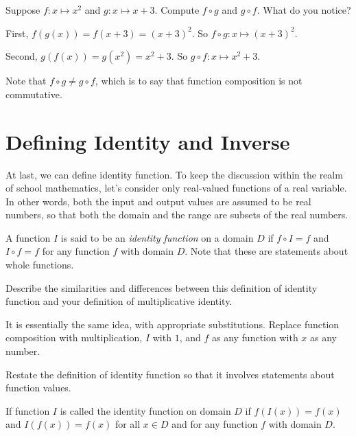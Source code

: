 \documentclass{ximera}
\begin{document}
\begin{question}
Suppose $f: x\mapsto x^2$ and $g: x\mapsto x+3$.  Compute $f\circ g$ and $g\circ f$.  What do you notice?  
\begin{freeResponse}
First, $f(g(x))=f(x+3)=(x+3)^2$.  So $f\circ g: x\mapsto (x+3)^2$. 

Second, $g(f(x))=g(x^2)=x^2+3$.  So $g\circ f: x\mapsto x^2+3$. 

Note that $f\circ g \neq g\circ f$, which is to say that function composition is not commutative.  
\end{freeResponse}
\end{question}

\section*{Defining Identity and Inverse}
At last, we can define identity function.  To keep the discussion within the realm of school mathematics, let's consider only real-valued functions of a real variable.  In other words, both the input and output values are assumed to be real numbers, so that both the domain and the range are subsets of the real numbers.  

\begin{definition}
A function $I$ is said to be an \emph{identity function} on a domain $D$ if $f\circ I=f$ and $I\circ f = f$ for any function $f$ with domain $D$.  Note that these are statements about whole functions.  
\end{definition}

\begin{question}
Describe the similarities and differences between this definition of identity function and your definition of multiplicative identity.  
\begin{freeResponse}
It is essentially the same idea, with appropriate substitutions.  Replace function composition with multiplication, $I$ with $1$, and $f$ as any function with $x$ as any number.  
\end{freeResponse}
\end{question}

\begin{question}
Restate the definition of identity function so that it involves statements about function values.  
\begin{freeResponse}
If function $I$ is called the identity function on domain $D$ if $f(I(x)) = f(x)$ and $I(f(x))=f(x)$ for all $x\in D$ and for any function $f$ with domain $D$.  
\end{freeResponse}
\end{question}
\end{document}
